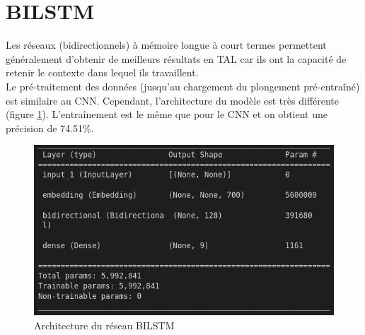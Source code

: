 \section{BILSTM}
Les réseaux (bidirectionnels) à mémoire longue à court termes permettent généralement d'obtenir de meilleurs résultats en TAL car ils ont la capacité de retenir le contexte dans lequel ils travaillent.\\
Le pré-traitement des données (jusqu'au chargement du plongement pré-entraîné) est similaire au CNN. Cependant, l'architecture du modèle est très différente (figure \ref{architecture_bilstm}). L'entraînement est le même que pour le CNN et on obtient une précision de 74.51\%.

\begin{figure}
    \center
    \includegraphics[scale=.3]{img/architecture_bilstm.png}
    \caption{Architecture du réseau BILSTM}
    \label{architecture_bilstm}
\end{figure}